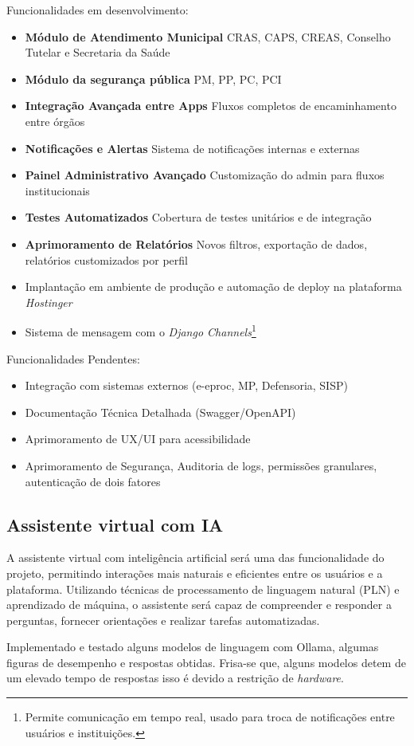 Funcionalidades em desenvolvimento:
\begin{itemize}
    \item \textbf{Módulo de Atendimento Municipal} CRAS, CAPS, CREAS, Conselho Tutelar e Secretaria da Saúde
    \item \textbf{Módulo da segurança pública} PM, PP, PC, PCI
    \item \textbf{Integração Avançada entre Apps} Fluxos completos de encaminhamento entre órgãos
    \item \textbf{Notificações e Alertas} Sistema de notificações internas e externas
    \item \textbf{Painel Administrativo Avançado} Customização do admin para fluxos institucionais
    \item \textbf{Testes Automatizados} Cobertura de testes unitários e de integração
    \item \textbf{Aprimoramento de Relatórios} Novos filtros, exportação de dados, relatórios customizados por perfil
    \item Implantação em ambiente de produção e automação de deploy na plataforma \textit{Hostinger}
    \item Sistema de mensagem com o \textit{Django Channels}\footnote{Permite comunicação em tempo real, usado para troca de notificações entre usuários e instituições.}
\end{itemize}


Funcionalidades Pendentes:
\begin{itemize}
    \item Integração com sistemas externos (e-eproc, MP, Defensoria, SISP)
    \item Documentação Técnica Detalhada (Swagger/OpenAPI)
    \item Aprimoramento de UX/UI para acessibilidade
    
    \item Aprimoramento de Segurança, Auditoria de logs, permissões granulares, autenticação de dois fatores
\end{itemize}

\subsection{Assistente virtual com IA}

\par A assistente virtual com inteligência artificial será uma das funcionalidade do projeto, permitindo interações mais naturais e eficientes entre os usuários e a plataforma. Utilizando técnicas de processamento de linguagem natural (PLN) e aprendizado de máquina, o assistente será capaz de compreender e responder a perguntas, fornecer orientações e realizar tarefas automatizadas.
\par Implementado e testado alguns modelos de linguagem com Ollama, algumas figuras de desempenho e respostas obtidas. Frisa-se que, alguns modelos detem de um elevado tempo de respostas isso é devido a restrição de \textit{hardware}.



